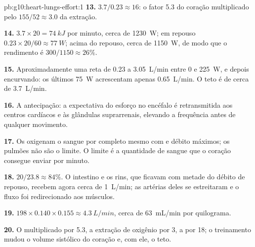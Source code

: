 \begin{solution}{pb:g10:heart-lungs-effort:1}
\textbf{13.} $3.7/0.23 \approx 16$: o fator 5.3 do coração multiplicado
pelo $155/52 \approx 3.0$ da extração.

\textbf{14.} $3.7 \times 20 = \qty{74}{kJ}$ por minuto, cerca de
\qty{1230}{W}; em repouso $0.23 \times 20/60 \approx \qty{77}{W}$;
acima do repouso, cerca de \qty{1150}{W}, de modo que o rendimento é
$300/1150 \approx
26\%$.

\textbf{15.} Aproximadamente uma reta de \num{0.23} a
\qty{3.05}{L/min} entre 0 e \qty{225}{W}, e depois encurvando: os
últimos \qty{75}{W} acrescentam apenas \qty{0.65}{L/min}. O teto é de
cerca de \qty{3.7}{L/min}.

\textbf{16.} A antecipação: a expectativa do esforço no encéfalo é
retransmitida aos centros cardíacos e às glândulas suprarrenais,
elevando a frequência antes de qualquer movimento.

\textbf{17.} Os  oxigenam o sangue por completo mesmo com
 e débito máximos; os pulmões não são o limite. O limite é a
quantidade de sangue que o coração consegue enviar por minuto.

\textbf{18.} $20/23.8 \approx 84\%$. O intestino e os rins, que ficavam
com metade do débito de repouso, recebem agora cerca de \qty{1}{L/min};
as artérias deles se estreitaram e o fluxo foi redirecionado aos
músculos.

\textbf{19.} $198 \times 0.140 \times 0.155 \approx \qty{4.3}{L/min}$,
cerca de \qty{63}{mL/min} por quilograma.

\textbf{20.} O  multiplicado por 5.3, a extração de
oxigênio por 3, a  por 18; o treinamento mudou o volume
sistólico do coração e, com ele, o teto.
\end{solution}
